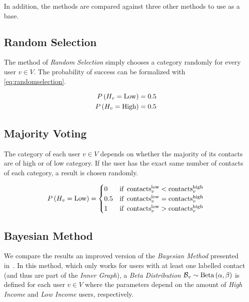 In addition, the methods are compared against three other methods to use as a base.

\subsection{Random Selection}

The method of \emph{Random Selection} simply chooses a category randomly for every user $v \in V$. The probability of success can be formalized with \cref{eq:randomselection}.

\begin{equation}
\label{eq:randomselection}
\begin{aligned}
	P \left( H_v = \operatorname{Low} \right) &= 0.5 \\
	P \left( H_v = \operatorname{High} \right) &= 0.5
\end{aligned}
\end{equation}

\subsection{Majority Voting}

The category of each user $v \in V$ depends on whether the majority of its contacts are of high or of low category. If the user has the exact same number of contacts of each category, a result is chosen randomly.

\begin{equation}
\label{eq:majorityvoting}
	P \left( H_v = \operatorname{Low} \right) =
	\begin{cases}
		0 & \text{if} \ \operatorname{contacts}^{\operatorname{low}}_v < \operatorname{contacts}^{\operatorname{high}}_v \\
		0.5 & \text{if} \ \operatorname{contacts}^{\operatorname{low}}_v = \operatorname{contacts}^{\operatorname{high}}_v \\
		1 & \text{if} \ \operatorname{contacts}^{\operatorname{low}}_v > \operatorname{contacts}^{\operatorname{high}}_v
	\end{cases}
\end{equation}

\subsection{Bayesian Method}

We compare the results an improved version of the \emph{Bayesian Method} presented in~\cite{fixmanasonam2016}. In this method, which only works for users with at least one labelled contact (and thus are part of the \emph{Inner Graph}), a \emph{Beta Distribution} $\operatorname{\mathcal{B}}_v \sim \operatorname{Beta} \left( \alpha, \beta \right)$ is defined for each user $v \in V$ where the parameters depend on the amount of \emph{High Income} and \emph{Low Income} users, respectively.

